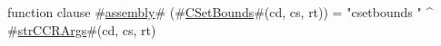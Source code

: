 function clause #\hyperref[sailMIPSzassembly]{assembly}# (#\hyperref[sailMIPSzCSetBounds]{CSetBounds}#(cd, cs, rt)) = "csetbounds " ^ #\hyperref[sailMIPSzstrCCRArgs]{strCCRArgs}#(cd, cs, rt)
